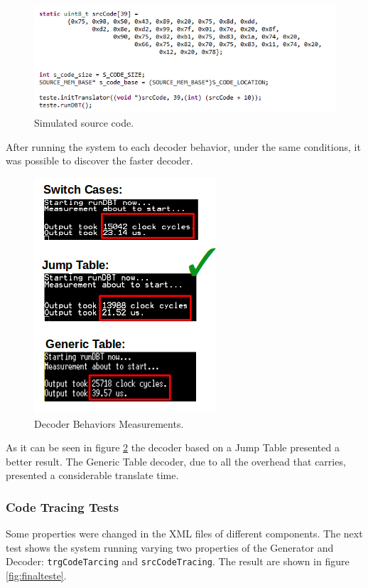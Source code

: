 \begin{figure}[H]
\centerline{
\includegraphics[scale=0.65]{images/sourceCode.png}
}
\caption{Simulated source code.}
\label{fig:SourceCodeDecoderTest}
\end{figure}

After running the system to each decoder behavior, under the same conditions, it was possible to discover the faster decoder.

\begin{figure}[H]
\centerline{
\includegraphics[scale=0.67]{images/DecoderBehaviorsResults}
}
\caption{Decoder Behaviors Measurements.}
\label{fig:DecoderBehaviorsMeasurements}
\end{figure}

As it can be seen in figure \ref{fig:DecoderBehaviorsMeasurements} the decoder based on a Jump Table presented a better result. The Generic Table decoder, due to all the overhead that carries, presented a considerable translate time.

\subsubsection{Code Tracing Tests}

Some properties were changed in the XML files of different components. The next test shows the system running varying two properties of the Generator and Decoder: \texttt{trgCodeTarcing} and \texttt{srcCodeTracing}. The result are shown in figure \ref{fig:finalteste}.

